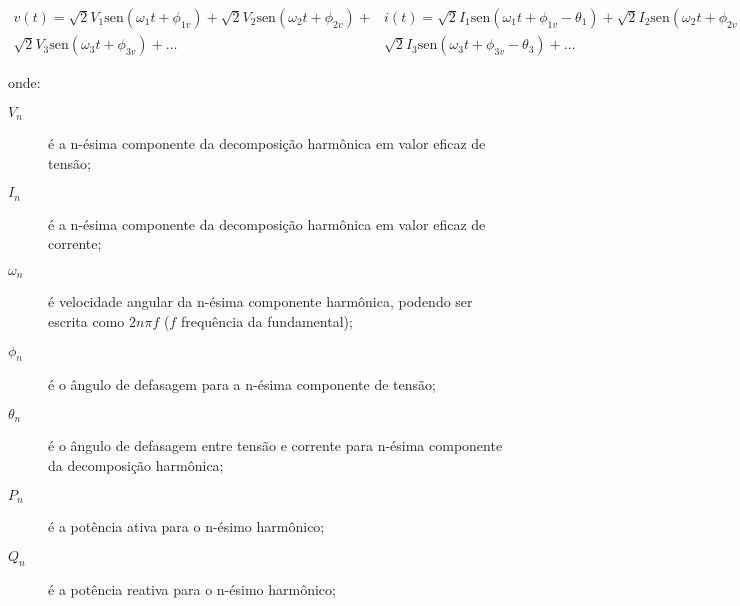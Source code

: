\begin{subequations} \label{eq:ipqds}
\begin{eqnarray}\label{eq:v}
v(t) = \sqrt{2}V_1 \text{sen}(\omega_1 t + \phi_{1v}) +
\sqrt{2}V_2 \text{sen}(\omega_2 t + \phi_{2v}) +  \nonumber \\
\sqrt{2}V_3 \text{sen}(\omega_3 t + \phi_{3v}) + \dots
\end{eqnarray}
\begin{eqnarray}\label{eq:i}
i(t)=\sqrt{2}I_1 \text{sen}(\omega_1 t + \phi_{1v} - \theta_{1}) +
\sqrt{2}I_2 \text{sen}(\omega_2 t + \phi_{2v} - \theta_{2}) +
\nonumber \\
\sqrt{2}I_3 \text{sen}(\omega_3 t + \phi_{3v} - \theta_{3}) + \dots
\end{eqnarray}
\begin{equation}\label{eq:pn}
P_n=V_nI_n\cos{\theta_n} ~~,~~ P=\sum_{n=1}^{\infty}P_n
\end{equation}
\begin{equation}\label{eq:q}
Q_n=V_nI_n\text{sen}{\theta_n} ~~,~~ Q=\sum_{n=1}^{\infty}Q_n
\end{equation}
\begin{equation}\label{eq:s}
S=VI
\end{equation}
\begin{equation}\label{eq:d}
D^2=S^2-P^2-Q^2
\end{equation}
\end{subequations}

\noindent onde:

\begin{description}
\item[$V_n$] é a n-ésima componente da decomposição harmônica em valor
eficaz de tensão;
\item[$I_n$] é a n-ésima componente da decomposição harmônica em valor
eficaz de corrente;
\item[$\omega_n$] é velocidade angular da n-ésima componente
harmônica, podendo ser escrita como $2n\pi f$ ($f$ frequência da
fundamental);
\item[$\phi_n$] é o ângulo de defasagem para a n-ésima componente de
tensão;
\item[$\theta_n$] é o ângulo de defasagem entre tensão e corrente para
n-ésima componente da decomposição harmônica;
\item[$P_n$] é a potência ativa para o n-ésimo harmônico;
\item[$Q_n$] é a potência reativa para o n-ésimo harmônico;
\end{description}

